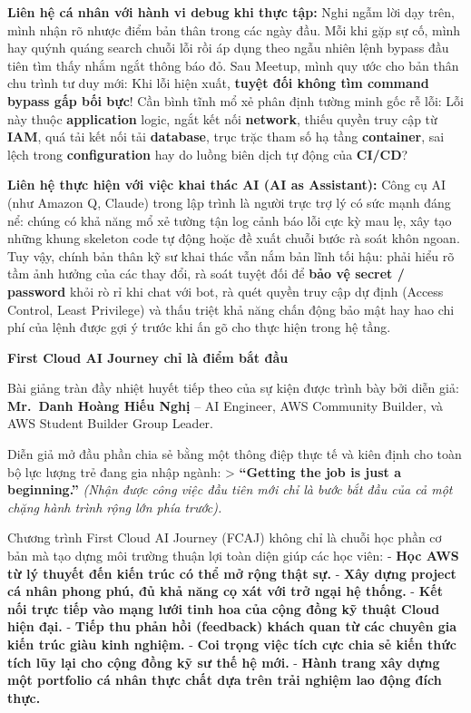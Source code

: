 \textbf{Liên hệ cá nhân với hành vi debug khi thực tập:} Nghi ngẫm lời
dạy trên, mình nhận rõ nhược điểm bản thân trong các ngày đầu. Mỗi khi
gặp sự cố, mình hay quýnh quáng search chuỗi lỗi rồi áp dụng theo ngẫu
nhiên lệnh bypass đầu tiên tìm thấy nhắm ngắt thông báo đỏ. Sau Meetup,
mình quy ước cho bản thân chu trình tư duy mới: Khi lỗi hiện xuất,
\textbf{tuyệt đối không tìm command bypass gấp bối bực}! Cần bình tĩnh
mổ xẻ phân định tường minh gốc rễ lỗi: Lỗi này thuộc
\textbf{application} logic, ngắt kết nối \textbf{network}, thiếu quyền
truy cập từ \textbf{IAM}, quá tải kết nối tải \textbf{database}, trục
trặc tham số hạ tầng \textbf{container}, sai lệch trong
\textbf{configuration} hay do luồng biên dịch tự động của
\textbf{CI/CD}?

\textbf{Liên hệ thực hiện với việc khai thác AI (AI as Assistant):} Công
cụ AI (như Amazon Q, Claude) trong lập trình là người trực trợ lý có sức
mạnh đáng nể: chúng có khả năng mổ xẻ tường tận log cảnh báo lỗi cực kỳ
mau lẹ, xây tạo những khung skeleton code tự động hoặc đề xuất chuỗi
bước rà soát khôn ngoan. Tuy vậy, chính bản thân kỹ sư khai thác vẫn nắm
bản lĩnh tối hậu: phải hiểu rõ tầm ảnh hưởng của các thay đổi, rà soát
tuyệt đối để \textbf{bảo vệ secret / password} khỏi rò rỉ khi chat với
bot, rà quét quyền truy cập dự định (Access Control, Least Privilege) và
thấu triệt khả năng chấn động bảo mật hay hao chi phí của lệnh được gợi
ý trước khi ấn gõ cho thực hiện trong hệ tầng.

\vspace{0.5em}\noindent\textbf{First Cloud AI Journey chỉ là điểm bắt
đầu}\par

Bài giảng tràn đầy nhiệt huyết tiếp theo của sự kiện được trình bày bởi
diễn giả: \textbf{Mr.~Danh Hoàng Hiếu Nghị} -- AI Engineer, AWS
Community Builder, và AWS Student Builder Group Leader.

Diễn giả mở đầu phần chia sẻ bằng một thông điệp thực tế và kiên định
cho toàn bộ lực lượng trẻ đang gia nhập ngành: \textgreater{}
\textbf{``Getting the job is just a beginning.''} \emph{(Nhận được công
việc đầu tiên mới chỉ là bước bắt đầu của cả một chặng hành trình rộng
lớn phía trước).}

Chương trình First Cloud AI Journey (FCAJ) không chỉ là chuỗi học phần
cơ bản mà tạo dựng môi trường thuận lợi toàn diện giúp các học viên: -
\textbf{Học AWS từ lý thuyết đến kiến trúc có thể mở rộng thật sự.} -
\textbf{Xây dựng project cá nhân phong phú, đủ khả năng cọ xát với trở
ngại hệ thống.} - \textbf{Kết nối trực tiếp vào mạng lưới tinh hoa của
cộng đồng kỹ thuật Cloud hiện đại.} - \textbf{Tiếp thu phản hồi
(feedback) khách quan từ các chuyên gia kiến trúc giàu kinh nghiệm.} -
\textbf{Coi trọng việc tích cực chia sẻ kiến thức tích lũy lại cho cộng
đồng kỹ sư thế hệ mới.} - \textbf{Hành trang xây dựng một portfolio cá
nhân thực chất dựa trên trải nghiệm lao động đích thực.}

